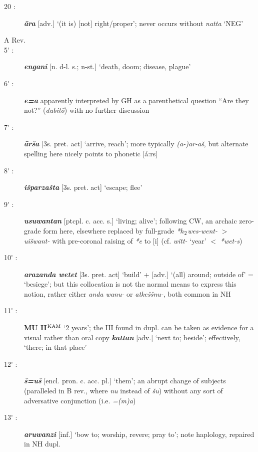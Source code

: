 \documentclass[10pt]{article}
\newcommand{\supersc}[1]{$^{\textrm{\scriptsize{#1}}}$}  	%
\newcommand{\subsc}[1]{$_{\textrm{\scriptsize{#1}}}$}	%
\newcommand{\bit}[1]{\textbf{\textit{#1}}}				%
\newcommand{\p}[1]{{\tiny[{#1}]}}					%
\newcommand{\hii}{h\subsc{2}}								%
\newcommand{\pr}{\'{ }}									%
\newcommand{\hith}{\textsubwedge{h}}
\renewcommand{\.}[1]{\textsubdot{#1}}
\begin{document}
\begin{description}
\item[20 :] \bit{\=ara} \p{adv.} `(it is) [not] right/proper'; never occurs without \textit{natta} `NEG'

\smallskip

\item[A Rev.]

\smallskip

\item[5{\pr} :] \bit{{\hith}engani} \p{n. d-l. s.; n-st.} `death, doom; disease, plague'

\item[6{\pr} :] \bit{e=a} apparently interpreted by GH as a parenthetical question ``Are they not?'' (\textit{dubit\=o}) with no further discussion

\item[7{\pr} :] \bit{\=ar\v{s}a} \p{3s. pret. act} `arrive, reach'; more typically \textit{(a-)ar-a\v{s}}, but alternate spelling here nicely points to phonetic [\'a:rs]

\item[8{\pr} :] \bit{i\v{s}parza\v{s}ta} \p{3s. pret. act} `escape; flee'

\item[9{\pr} :] \bit{{\hith}usuwantan} \p{ptcpl. c. acc. s.} `living; alive'; following CW, an archaic zero-grade form here, elsewhere replaced by full-grade \textit{*{\hii}wes-went-} $>$ \textit{{\hith}ui\v{s}want-} with pre-coronal raising of \textit{*e} to [i] (cf. \textit{witt-} `year' $<$ \textit{*wet-s})

\item[10{\pr} :] \bit{ara{\hith}zanda wetet} \p{3s. pret. act} `build' + \p{adv.} `(all) around; outside of' = `besiege'; but this collocation is not the normal means to express this notion, rather either \textit{anda wa{\hith}nu-} or \textit{{\hith}atke\v{s}\v{s}nu-}, both common in NH

\item[11{\pr} :] \textbf{MU II\supersc{KAM}} `2 years'; the III found in dupl. can be taken as evidence for a visual rather than oral copy \bit{kattan} \p{adv.} `next to; beside'; effectively, `there; in that place'

\item[12{\pr} :] \bit{\v{s}=u\v{s}} \p{encl. pron. c. acc. pl.} `them'; an abrupt change of subjects (paralleled in B rev., where \textit{nu} instead of \textit{\v{s}u}) without any sort of adversative conjunction (i.e. \textit{=(m)a})

\item[13{\pr} :] \bit{aruwanzi} \p{inf.} `bow to; worship, revere; pray to'; note haplology, repaired in NH dupl.


\end{description}
\end{document}
